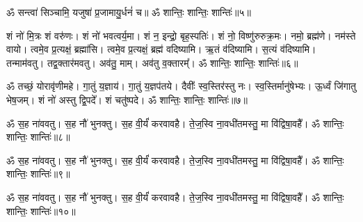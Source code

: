 ॐ सन्त्वा॑ सिञ्चामि॒ यजुषा॑ प्र॒जामायु॒र्धनं॑ च॥ ॐ शान्तिः॒ शान्तिः॒ शान्तिः॑॥५॥


शं नो॑ मि॒त्रः  शं वरु॑णः। शं नो॑ भवत्वर्य॒मा। शं न॒ इन्द्रो॒ बृह॒स्पतिः॑। शं नो॒ विष्णु॑रुरुक्र॒मः। नमो॒ ब्रह्म॑णे। नम॑स्ते वायो। त्वमे॒व प्र॒त्यक्षं॒ ब्रह्मा॑सि। त्वमे॒व प्र॒त्यक्षं॒ ब्रह्म॑ वदिष्यामि। ऋ॒तं व॑दिष्यामि। स॒त्यं व॑दिष्यामि। तन्माम॑वतु। तद्व॒क्तार॑मवतु। अव॑तु॒ माम्। अव॑तु व॒क्तारम्᳚। ॐ शान्तिः॒ शान्तिः॒ शान्तिः॑॥६॥

ॐ तच्छं॒ योरावृ॑णीमहे। गा॒तुं य॒ज्ञाय॑। गा॒तुं य॒ज्ञप॑तये। 
दैवीः᳚ स्व॒स्तिर॑स्तु नः। स्व॒स्तिर्मानु॑षेभ्यः। ऊ॒र्ध्वं जि॑गातु भेष॒जम्। 
शं नो॑ अस्तु द्वि॒पदे᳚। शं चतु॑ष्पदे। ॐ शान्तिः॒ शान्तिः॒ शान्तिः॑॥७॥

ॐ स॒ह ना॑ववतु। स॒ह नौ॑ भुनक्तु। स॒ह वी॒र्यं॑ करवावहै। ते॒ज॒स्वि ना॒वधी॑तमस्तु॒ मा वि॑द्विषा॒वहै᳚। ॐ शान्तिः॒ शान्तिः॒ शान्तिः॑॥८॥

ॐ स॒ह ना॑ववतु। स॒ह नौ॑ भुनक्तु। स॒ह वी॒र्यं॑ करवावहै। ते॒ज॒स्वि ना॒वधी॑तमस्तु॒ मा वि॑द्विषा॒वहै᳚। ॐ शान्तिः॒ शान्तिः॒ शान्तिः॑॥९॥

ॐ स॒ह ना॑ववतु। स॒ह नौ॑ भुनक्तु। स॒ह वी॒र्यं॑ करवावहै। ते॒ज॒स्वि ना॒वधी॑तमस्तु॒ मा वि॑द्विषा॒वहै᳚। ॐ शान्तिः॒ शान्तिः॒ शान्तिः॑॥१०॥
